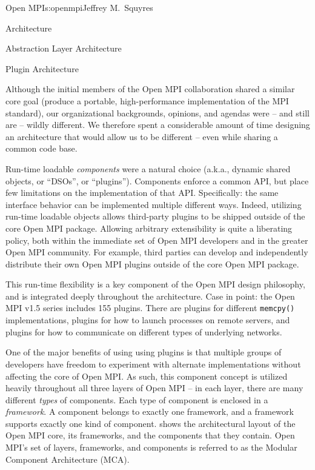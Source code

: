 \begin{aosachapter}{Open MPI}{s:openmpi}{Jeffrey M.\ Squyres}
\begin{aosasect1}{Architecture}
\begin{aosasect2}{Abstraction Layer Architecture}
\end{aosasect2}


\begin{aosasect2}{Plugin Architecture}


Although the initial members of the Open MPI collaboration shared a
similar core goal (produce a portable, high-performance
implementation of the MPI standard), our organizational backgrounds,
opinions, and agendas were -- and still are -- wildly different.
%
We therefore spent a considerable amount of time designing an
architecture that would allow us to be different -- even while sharing
a common code base.

Run-time loadable {\em components} were a natural choice (a.k.a.,
dynamic shared objects, or ``DSOs'', or ``plugins'').  Components
enforce a common API, but place few limitations on the implementation
of that API.
%
Specifically: the same interface behavior can be implemented multiple
different ways.
%
Indeed, utilizing run-time loadable objects allows third-party plugins
to be shipped outside of the core Open MPI package.  Allowing
arbitrary extensibility is quite a liberating policy, both within the
immediate set of Open MPI developers and in the greater Open MPI
community.  For example, third parties can develop and independently
distribute their own Open MPI plugins outside of the core Open MPI
package.

This run-time flexibility is a key component of the Open MPI design
philosophy, and is integrated deeply throughout the architecture.
%
Case in point: the Open MPI v1.5 series includes 155 plugins.
%
There are plugins for different {\tt memcpy()} implementations,
plugins for how to launch processes on remote servers, and plugins for
how to communicate on different types of underlying networks.

One of the major benefits of using using plugins is that multiple
groups of developers have freedom to experiment with alternate
implementations without affecting the core of Open MPI.
%
As such, this component concept is utilized heavily throughout all
three layers of Open MPI -- in each layer, there are many different
{\em types} of components.  
%
Each type of component is enclosed in a {\em framework}.
%
A component belongs to exactly one framework, and a framework supports
exactly one kind of component.
%
 shows the architectural layout of the
Open MPI core, its frameworks, and the components that they contain.
%
Open MPI's set of layers, frameworks, and components is referred to as
the Modular Component Architecture (MCA).


\end{aosasect2}
\end{aosasect1}
\end{aosachapter}
